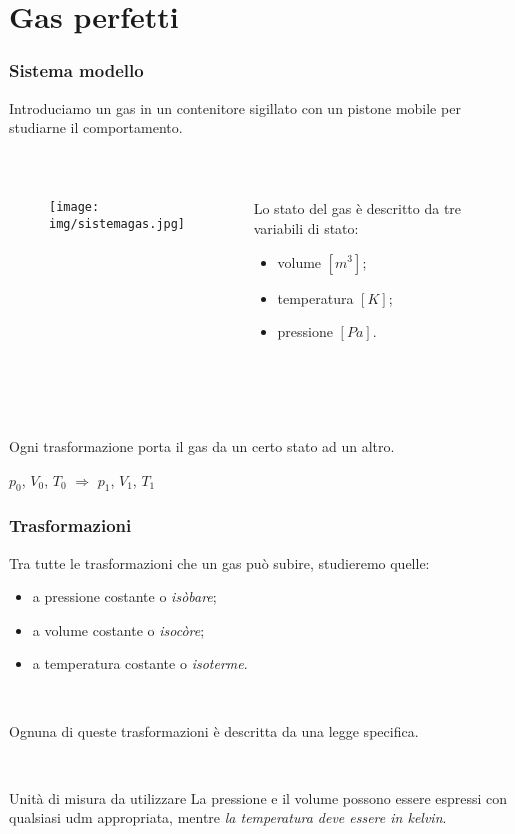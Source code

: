 \documentclass[]{beamer}
\theoremstyle{plain}
\begin{document}
\section{Gas perfetti}

\begin{frame}
\frametitle{Sistema modello}
Introduciamo un gas in un contenitore sigillato con un pistone mobile per studiarne il comportamento.

~

\begin{columns}
\begin{column}{0.3\textwidth}
\begin{figure}
\texttt{[image: img/sistemagas.jpg]}
\end{figure}\pause
\end{column}
\begin{column}{0.5\textwidth}
Lo stato del gas è descritto da tre \alert<2>{variabili di stato}:\pause
\begin{itemize}
  \item \alert<3>{volume} $ [m^3 ] $;\pause
  \item \alert<4>{temperatura} $ [ K ] $;\pause
  \item \alert<5>{pressione} $ [ Pa ] $.
\end{itemize}
\end{column}
\end{columns}\pause

~

~

Ogni trasformazione porta il gas da un certo stato ad un altro.
\begin{center}
$ p_0 $, $ V_0 $, $ T_0 $ $ \Longrightarrow $ $ p_1 $, $ V_1 $, $ T_1 $
\end{center}
\end{frame}


\begin{frame}
\frametitle{Trasformazioni}
Tra tutte le trasformazioni che un gas può subire, studieremo quelle:
\begin{itemize}
  \item a \alert<1>{pressione costante} o \emph{isòbare};\pause
  \item a \alert<2>{volume costante} o \emph{isocòre};\pause
  \item a \alert<3>{temperatura costante} o \emph{isoterme}.\pause
\end{itemize}

~

Ognuna di queste trasformazioni è descritta da una legge specifica.\pause

~

\begin{alertblock}{Unità di misura da utilizzare}
La pressione e il volume possono essere espressi con qualsiasi udm appropriata, mentre \emph{la temperatura deve essere in kelvin}.
\end{alertblock}
\end{frame}
\end{document}
